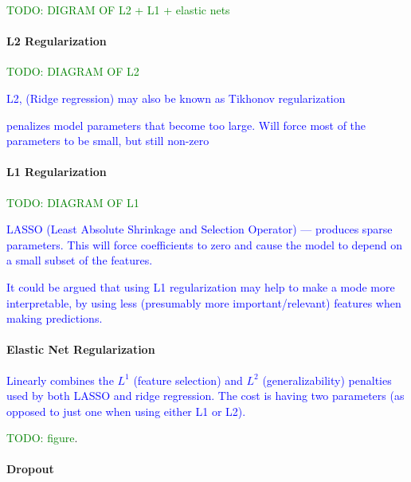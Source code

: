 \textcolor{green}{TODO: DIGRAM OF L2 + L1 + elastic nets}

\paragraph{L2 Regularization}

\textcolor{green}{TODO: DIAGRAM OF L2}

\textcolor{blue}{L2, ({Ridge regression}) may also be known as {Tikhonov regularization}}

\textcolor{blue}{penalizes model parameters that become too large. Will force most of the parameters to be small, but still non-zero}


\paragraph{L1 Regularization}

\textcolor{green}{TODO: DIAGRAM OF L1}

\textcolor{blue}{LASSO (Least Absolute Shrinkage and Selection Operator) --- produces sparse parameters. This will force coefficients to zero and cause the model to depend on a small subset of the features.}

\textcolor{blue}{It could be argued that using L1 regularization may help to make a mode more interpretable, by using less (presumably more important/relevant) features when making predictions.}


\paragraph{Elastic Net Regularization}

\textcolor{blue}{Linearly combines the $L^1$ (feature selection) and $L^2$ (generalizability) penalties used by both LASSO and ridge regression. The cost is having two parameters (as opposed to just one when using either L1 or L2).}

\textcolor{green}{TODO: figure}.


\paragraph{Dropout}


